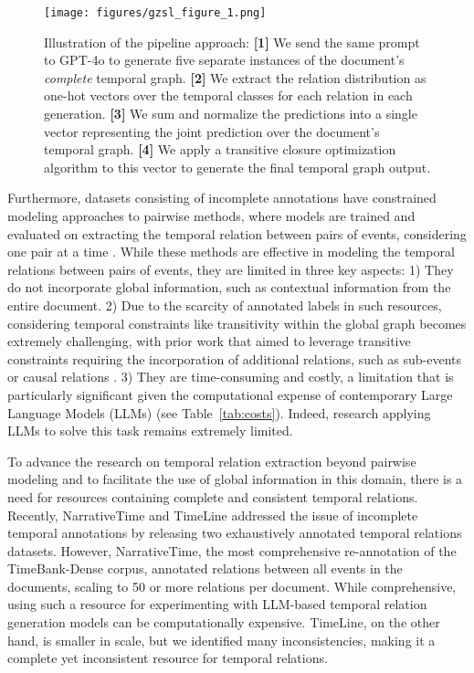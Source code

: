 \begin{figure*}[t!]
\centering
\texttt{[image: figures/gzsl\_figure\_1.png]}
\caption{Illustration of the pipeline approach:  
\textbf{[1]} We send the same prompt to GPT-4o to generate five separate instances of the document's \textit{complete} temporal graph.  
\textbf{[2]} We extract the relation distribution as one-hot vectors over the temporal classes for each relation in each generation. 
\textbf{[3]} We sum and normalize the predictions into a single vector representing the joint prediction over the document's temporal graph.  
\textbf{[4]} We apply a transitive closure optimization algorithm to this vector to generate the final temporal graph output.
}
\label{fig:figure1}
\end{figure*}

Furthermore, datasets consisting of incomplete annotations have constrained modeling approaches to pairwise methods, where models are trained and evaluated on extracting the temporal relation between pairs of events, considering one pair at a time \cite{huang-etal-2023-classification, tan-etal-2023-event, yuan-etal-2023-zero, niu-etal-2024-contempo}. While these methods are effective in modeling the temporal relations between pairs of events, they are limited in three key aspects: 1) They do not incorporate global information, such as contextual information from the entire document. 2) Due to the scarcity of annotated labels in such resources, considering temporal constraints like transitivity within the global graph becomes extremely challenging, with prior work that aimed to leverage transitive constraints requiring the incorporation of additional relations, such as sub-events \cite{wang-etal-2020-joint} or causal relations \cite{ning-etal-2018-joint}. 3) They are time-consuming and costly, a limitation that is particularly significant given the computational expense of contemporary Large Language Models (LLMs) (see Table~\ref{tab:costs}). Indeed, research applying LLMs to solve this task remains extremely limited.

To advance the research on temporal relation extraction beyond pairwise modeling and to facilitate the use of global information in this domain, there is a need for resources containing complete and consistent temporal relations. Recently, NarrativeTime \cite{rogers-etal-2024-narrativetime} and TimeLine \cite{alsayyahi-batista-navarro-2023-timeline} addressed the issue of incomplete temporal annotations by releasing two exhaustively annotated temporal relations datasets. However, NarrativeTime, the most comprehensive re-annotation of the TimeBank-Dense corpus, annotated relations between all events in the documents, scaling to 50 or more relations per document. While comprehensive, using such a resource for experimenting with LLM-based temporal relation generation models can be computationally expensive. TimeLine, on the other hand, is smaller in scale, but we identified many inconsistencies, making it a complete yet inconsistent resource for temporal relations.


